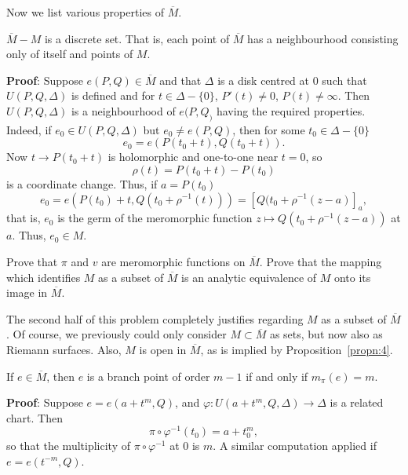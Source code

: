 \documentclass[a4paper,11pt]{article}
\begin{document}
Now we list various properties of $\overline{M}$.

\begin{propn}
  \label{propn:4}
  $\overline{M} - M$ is a discrete set.  That is, each point of
  $\overline{M}$ has a neighbourhood consisting only of itself and
  points of $M$.
\end{propn}

\begin{mdframed}
  \textbf{Proof}: Suppose $e(P,Q) \in \overline{M}$ and that $\Delta$
  is a disk centred at 0 such that $U(P,Q,\Delta)$ is defined and for
  $t \in \Delta - \{0\}$, $P'(t) \ne 0$, $P(t) \ne \infty$.  Then
  $U(P,Q,\Delta)$ is a neighbourhood of $e(P,Q_)$ having the required
  properties. Indeed, if $e_0 \in U(P,Q,\Delta)$ but $e_0 \ne e(P,Q)$,
  then for some $t_0 \in \Delta - \{0\}$
  $$
  e_0 = e(P(t_0 + t), Q(t_0 + t)).
  $$
  Now $t \to P(t_0 + t)$ is holomorphic and one-to-one near $t = 0$,
  so
  $$
  \rho(t) = P(t_0 + t) - P(t_0)
  $$
  is a coordinate change.  Thus, if $a = P(t_0)$
  $$
  e_0 = e(P(t_0) + t, Q(t_0 + \rho^{-1}(t)))
  = [Q(t_0 + \rho^{-1}(z-a)]_a,
  $$
  that is, $e_0$ is the germ of the meromorphic function $z \mapsto
  Q(t_0 + \rho^{-1}(z-a))$ at $a$.  Thus, $e_0 \in M$.
\end{mdframed}

\begin{ques}
  \label{problem:4}
  Prove that $\pi$ and $v$ are meromorphic functions on
  $\overline{M}$.  Prove that the mapping which identifies $M$ as a
  subset of $\overline{M}$ is an analytic equivalence of $M$ onto its
  image in $\overline{M}$.
\end{ques}

The second half of this problem completely justifies regarding $M$ as
a subset of $\overline{M}$.  Of course, we previously could only
consider $M \subset \overline{M}$ as sets, but now also as Riemann
surfaces.  Also, $M$ is open in $\overline{M}$, as is implied by
Proposition~\ref{propn:4}.

\begin{propn}
  \label{propn:5}
  If $e \in \overline{M}$, then $e$ is a branch point of order $m-1$
  if and only if $m_\pi(e) = m$.
\end{propn}

\begin{mdframed}
  \textbf{Proof}: Suppose $e = e(a+t^m, Q)$, and $\varphi : U(a+t^m,
  Q, \Delta) \to \Delta$ is a related chart.  Then
  $$
  \pi \circ \varphi^{-1}(t_0) = a + t_0^m,
  $$
  so that the multiplicity of $\pi \circ \varphi^{-1}$ at 0 is $m$.  A
  similar computation applied if $e = e(t^{-m}, Q)$.
\end{mdframed}
\end{document}
